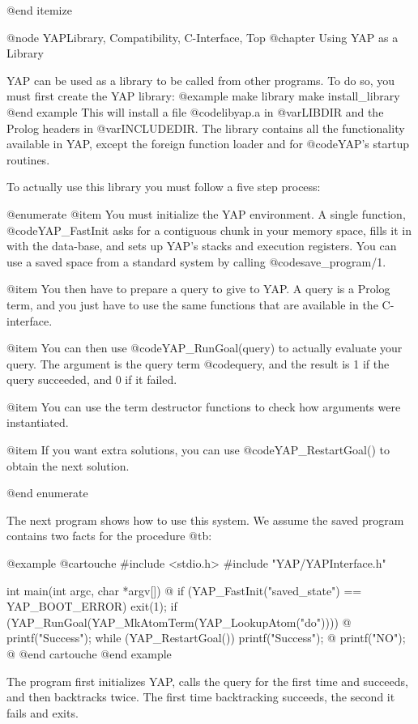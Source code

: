 {{{{{{{{{@end itemize

@node YAPLibrary, Compatibility, C-Interface, Top
@chapter Using YAP as a Library

YAP can be used as a library to be called from other
programs. To do so, you must first create the YAP library:
@example
make library
make install_library
@end example
This will install a file @code{libyap.a} in @var{LIBDIR} and the Prolog
headers in @var{INCLUDEDIR}. The library contains all the functionality
available in YAP, except the foreign function loader and for
@code{YAP}'s startup routines.

To actually use this library you must follow a five step process:

@enumerate
@item
 You must initialize the YAP environment. A single function,
@code{YAP_FastInit} asks for a contiguous chunk in your memory space, fills
it in with the data-base, and sets up YAP's stacks and
execution registers. You can use a saved space from a standard system by
calling @code{save_program/1}.
     
@item You then have to prepare a query to give to
YAP. A query is a Prolog term, and you just have to use the same
functions that are available in the C-interface.

@item You can then use @code{YAP_RunGoal(query)} to actually evaluate your
query. The argument is the query term @code{query}, and the result is 1
if the query succeeded, and 0 if it failed.

@item You can use the term destructor functions to check how
arguments were instantiated.

@item If you want extra solutions, you can use
@code{YAP_RestartGoal()} to obtain the next solution.

@end enumerate

The next program shows how to use this system. We assume the saved
program contains two facts for the procedure @t{b}:

@example
@cartouche
#include <stdio.h>
#include "YAP/YAPInterface.h"


int
main(int argc, char *argv[]) @{
  if (YAP_FastInit("saved_state") == YAP_BOOT_ERROR)
    exit(1);
  if (YAP_RunGoal(YAP_MkAtomTerm(YAP_LookupAtom("do")))) @{
    printf("Success\n");
    while (YAP_RestartGoal())
      printf("Success\n");
  @}
  printf("NO\n");
@}
@end cartouche
@end example

The program first initializes YAP, calls the query for the
first time and succeeds, and then backtracks twice. The first time
backtracking succeeds, the second it fails and exits.

}}}}}}}}}
